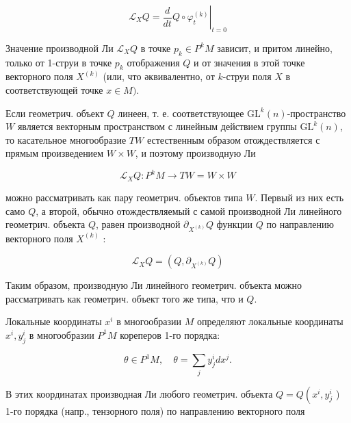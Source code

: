 \documentclass[10pt]{article}
\begin{document}
\[

\mathscr{L}_{X} Q=\left.\frac{d}{d t} Q \circ \varphi_{t}^{(k)}\right|_{t=0}

\]



Значение производной Ли $\mathscr{L}_{X} Q$ в точке $p_{k} \in P^{k} M$ зависит, и притом линейно, только от 1-струи в точке $p_{k}$ отображения $Q$ и от значения в этой точке векторного поля $X^{(k)}$ (или, что әквивалентно, от $k$-струи поля $X$ в соответствующей точке $x \in M)$.



Если геометрич. объект $Q$ линеен, т. е. соответствующее $\mathrm{GL}^{k}(n)$-пространство $W$ является векторным пространством с линейным действием группы $\mathrm{GL}^{k}(n)$, то касательное многообразие $T W$ естественным образом отождествляется с прямым произведением $W \times W$, и поэтому производную Ли



\[

\mathscr{L}_{X} Q: P^{k} M \longrightarrow T W=W \times W

\]



можно рассматривать как пару геометрич. объектов типа $W$. Первый из них есть само $Q$, а второй, обычно отождествляемый с самой производной Ли линейного геометрич. объекта $Q$, равен производной $\partial_{X^{(k)}} Q$ функции $Q$ по направлению векторного поля $X^{(k)}$ :



\[

\mathscr{L}_{X} Q=\left(Q, \partial_{X^{(k)}} Q\right)

\]



Таким образом, производную Ли линейного геометрич. объекта можно рассматривать как геометрич. объект того же типа, что и $Q$.



Локальные координаты $x^{i}$ в многообразии $M$ определяют локальные координаты $x^{i}, y_{j}^{i}$ в многообразии $P^{1} M$ кореперов 1-го порядка:



\[

\theta \in P^{1} M, \quad \theta=\sum_{j} y_{j}^{i} d x^{j} .

\]



В этих координатах производная Ли любого геометрич. объекта $Q=Q\left(x^{i}, y_{j}^{i}\right.$ ) 1-го порядка (напр., тензорного поля) по направлению векторного поля
\end{document}
